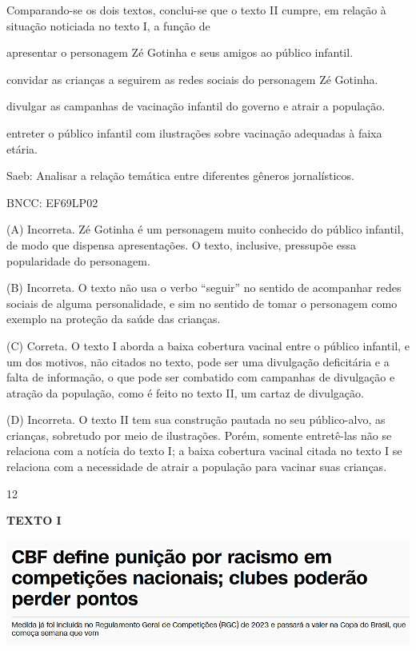 Comparando-se os dois textos, conclui-se que o texto II cumpre, em
relação à situação noticiada no texto I, a função de

\begin{escolha}
\item apresentar o personagem Zé Gotinha e seus amigos ao público infantil.

\item convidar as crianças a seguirem as redes sociais do personagem Zé
Gotinha.

\item divulgar as campanhas de vacinação infantil do governo e atrair a
população.

\item entreter o público infantil com ilustrações sobre vacinação adequadas
à faixa etária.
\end{escolha}

Saeb: Analisar a relação temática entre diferentes gêneros
jornalísticos.

BNCC: EF69LP02

(A) Incorreta. Zé Gotinha é um personagem muito conhecido do público
infantil, de modo que dispensa apresentações. O texto, inclusive,
pressupõe essa popularidade do personagem.

(B) Incorreta. O texto não usa o verbo ``seguir'' no sentido de
acompanhar redes sociais de alguma personalidade, e sim no sentido de
tomar o personagem como exemplo na proteção da saúde das crianças.

(C) Correta. O texto I aborda a baixa cobertura vacinal entre o público
infantil, e um dos motivos, não citados no texto, pode ser uma
divulgação deficitária e a falta de informação, o que pode ser combatido
com campanhas de divulgação e atração da população, como é feito no
texto II, um cartaz de divulgação.

(D) Incorreta. O texto II tem sua construção pautada no seu
público-alvo, as crianças, sobretudo por meio de ilustrações. Porém,
somente entretê-las não se relaciona com a notícia do texto I; a baixa
cobertura vacinal citada no texto I se relaciona com a necessidade de
atrair a população para vacinar suas crianças.

\num{12}

\textbf{TEXTO I}

\includegraphics[width=5.34306in,height=1.37786in]{./imgSAEB_8_POR/media/image33.png}

